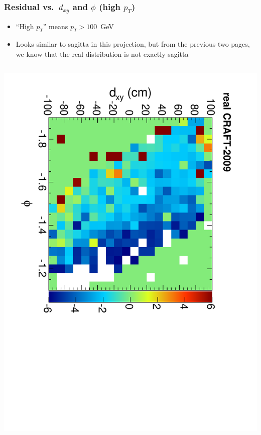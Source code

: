 \documentclass[compress]{beamer}
\begin{document}
\begin{frame}
\frametitle{Residual vs.~$d_{xy}$ and $\phi$ (high $p_T$)}

\begin{itemize}
\item ``High $p_T$'' means $p_T > 100$~GeV
\item Looks similar to sagitta in this projection, but from the previous two pages, we know that the real distribution is not exactly sagitta
\end{itemize}

\begin{columns}
\includegraphics[height=\linewidth, angle=90]{residx-dxy-phi-high_real.pdf}


\end{columns}
\end{frame}
\end{document}
